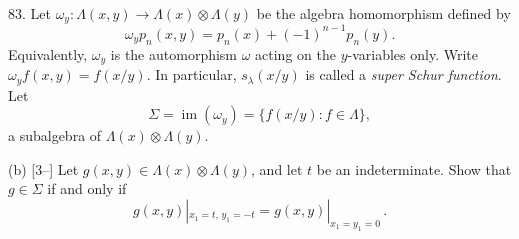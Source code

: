 83. Let $\omega_y:\Lambda(x,y)\to\Lambda(x)\otimes\Lambda(y)$ be the algebra homomorphism defined by
\[
\omega_y p_n(x,y)=p_n(x)+(-1)^{n-1}p_n(y). \tag{4}
\]
Equivalently, $\omega_y$ is the automorphism $\omega$ acting on the $y$-variables only. Write $\omega_y f(x,y)=f(x/y)$. In particular, $s_\lambda(x/y)$ is called a \emph{super Schur function}. Let
\[
\Sigma=\operatorname{im}(\omega_y)=\{f(x/y): f\in\Lambda\},
\]
a subalgebra of $\Lambda(x)\otimes\Lambda(y)$.

(b) [3--] Let $g(x,y)\in\Lambda(x)\otimes\Lambda(y)$, and let $t$ be an indeterminate. Show that $g\in\Sigma$ if and only if
\[
g(x,y)|_{x_1=t,\,y_1=-t}=g(x,y)|_{x_1=y_1=0}\,. \tag{6}
\]
